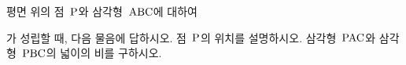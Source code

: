평면 위의 점~$\mathrm{P}$와 삼각형~$\mathrm{ABC}$에 대하여 \par\smallskip{}\par\smallskip\noindent 가 성립할 때, 다음 물음에 답하시오.
 점~$\mathrm{P}$의 위치를 설명하시오.
 삼각형~$\mathrm{PAC}$와 삼각형~$\mathrm{PBC}$의 넓이의 비를 구하시오.
